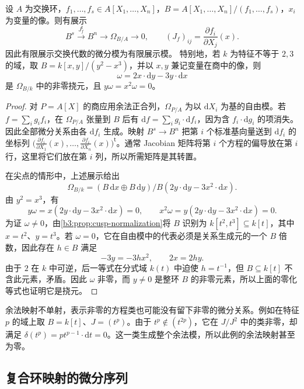 \begin{corollary}\label{b3:cor:differential-presentation}
	设 \(A\) 为交换环，\(f_1,\ldots,f_s\in A[X_1,\ldots,X_n]\)，\(B=A[X_1,\ldots,X_n]/(f_1,\ldots,f_s)\)，\(x_i\) 为变量的像。则有展示
	\[
		B^s\xrightarrow{J_f^{\mathsf t}} B^n\longrightarrow\Omega_{B/A}\longrightarrow0, \qquad (J_f)_{ij}=\dfrac{\partial f_i}{\partial X_j}(x).
	\]
	因此有限展示交换代数的微分模为有限展示模。 特别地，若 \(k\) 为特征不等于 \(2,3\) 的域，取 \(B=k[x,y]/(y^2-x^3)\)，并以 \(x,y\) 兼记变量在商中的像，则
	\[
		\omega=2x\cdot\mathrm{d}y-3y\cdot\mathrm{d}x
	\]
	是 \(\Omega_{B/k}\) 中的非零挠元，且 \(y\omega=x^2\omega=0\)。
\end{corollary}
\begin{proof}
	对 \(P=A[X]\) 的商应用余法正合列，\(\Omega_{P/A}\) 为以 \(\mathrm{d}X_i\) 为基的自由模。若 \(f=\sum_i g_if_i\)，在 \(\Omega_{P/A}\) 张量到 \(B\) 后有 \(\mathrm{d}f=\sum_i g_i\cdot\mathrm{d}f_i\)，因为含 \(f_i\cdot\mathrm{d}g_i\) 的项消失。因此全部微分关系由各 \(\mathrm{d}f_i\) 生成。映射 \(B^s\to B^n\) 把第 \(i\) 个标准基向量送到 \(\mathrm{d}f_i\) 的坐标列 \(\bigl(\frac{\partial f_i}{\partial X_1}(x),\ldots,\frac{\partial f_i}{\partial X_n}(x)\bigr)^{\mathsf t}\)。通常 Jacobian 矩阵将第 \(i\) 个方程的偏导放在第 \(i\) 行，这里将它们放在第 \(i\) 列，所以所需矩阵是其转置。

	在尖点的情形中，上述展示给出
	\[
		\Omega_{B/k}=(B\,\mathrm{d}x\oplus B\,\mathrm{d}y)/B(2y\cdot\mathrm{d}y-3x^2\cdot\mathrm{d}x).
	\]
	由 \(y^2=x^3\)，有
	\[
		y\omega=x(2y\cdot\mathrm{d}y-3x^2\cdot\mathrm{d}x)=0, \qquad x^2\omega=y(2y\cdot\mathrm{d}y-3x^2\cdot\mathrm{d}x)=0.
	\]
	为证 \(\omega\ne0\)，由\cref{b3:prop:cusp-normalization}将 \(B\) 识别为 \(k[t^2,t^3]\subseteq k[t]\)，其中 \(x=t^2\)、\(y=t^3\)。若 \(\omega=0\)，它在自由模中的代表必须是关系生成元的一个 \(B\) 倍数，因此存在 \(h\in B\) 满足
	\[
		-3y=-3hx^2,\qquad 2x=2hy.
	\]
	由于 \(2\) 在 \(k\) 中可逆，后一等式在分式域 \(k(t)\) 中迫使 \(h=t^{-1}\)，但 \(B\subseteq k[t]\) 不含此元素，矛盾。因此 \(\omega\) 非零，而 \(y\ne0\) 是整环 \(B\) 的非零元素，所以上面的零化等式也证明它是挠元。
\end{proof}

余法映射不单射，表示非零的方程类也可能没有留下非零的微分关系。例如在特征 \(p\) 的域上取 \(B=k[t]\)、\(J=(t^p)\)。由于 \(t^p\notin(t^{2p})\)，它在 \(J/J^2\) 中的类非零，却满足 \(\delta(t^p)=p t^{p-1}\cdot\mathrm{d}t=0\)。这一类生成整个余法模，所以此例的余法映射甚至为零。

\subsection{复合环映射的微分序列}
\label{b3:subsec:1402:02}

